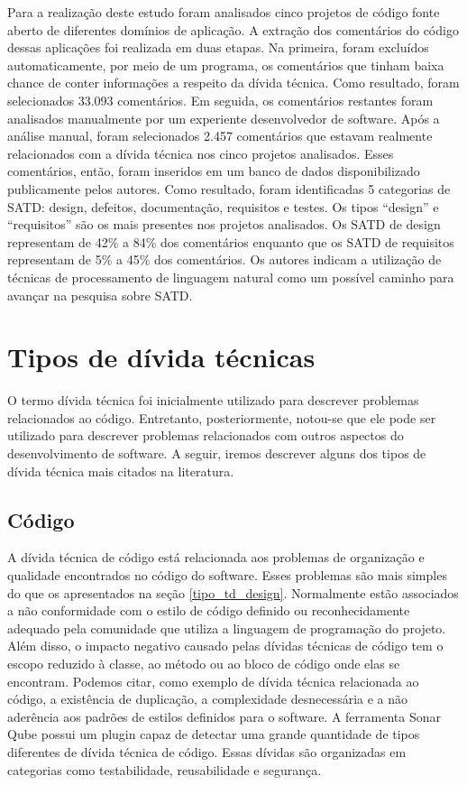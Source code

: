 Para a realização deste estudo foram analisados cinco projetos de código fonte aberto de diferentes domínios de aplicação. A extração dos comentários do código dessas aplicações foi realizada em duas etapas. Na primeira, foram excluídos automaticamente, por meio de um programa, os comentários que tinham baixa chance de conter informações a respeito da dívida técnica. Como resultado, foram selecionados 33.093  comentários. Em seguida, os comentários restantes foram analisados manualmente por um experiente desenvolvedor de software.  Após a análise manual, foram selecionados 2.457 comentários que estavam realmente relacionados com a dívida técnica nos cinco projetos analisados. Esses comentários, então, foram inseridos em um banco de dados disponibilizado publicamente pelos autores. Como resultado, foram identificadas 5 categorias de SATD: design, defeitos, documentação, requisitos e testes. Os tipos ``design'' e ``requisitos'' são os mais presentes nos projetos analisados. Os SATD de design representam de 42\% a 84\% dos comentários enquanto que os SATD de requisitos representam de 5\% a 45\% dos comentários. Os autores indicam a utilização de técnicas de processamento de linguagem natural como um possível caminho para avançar na pesquisa sobre SATD.

\section{Tipos de dívida técnicas}
\label{sec:tipos_td}

O termo dívida técnica foi inicialmente utilizado para descrever problemas relacionados ao código.  Entretanto, posteriormente, notou-se que ele pode ser utilizado para descrever problemas relacionados com outros aspectos do desenvolvimento de software. A seguir, iremos descrever alguns dos tipos de dívida técnica mais citados na literatura.

\subsection{Código}

A dívida técnica de código está relacionada aos problemas  de organização e qualidade encontrados no código do software. Esses problemas são mais simples do que os apresentados na seção \ref{tipo_td_design}. Normalmente estão associados a não conformidade com o estilo de código definido ou reconhecidamente adequado pela comunidade que utiliza a linguagem de programação do projeto. Além disso, o impacto negativo causado pelas dívidas técnicas de código tem o escopo reduzido à classe, ao método ou ao bloco de código onde elas se encontram.  Podemos citar, como exemplo de dívida técnica relacionada ao código, a existência de duplicação, a complexidade desnecessária e a não aderência aos padrões de estilos definidos para o software. A ferramenta Sonar Qube \cite{campbell2013sonarqube} possui um plugin capaz de detectar uma grande quantidade de tipos diferentes de dívida técnica de código. Essas dívidas são organizadas em categorias como testabilidade, reusabilidade e segurança. 


